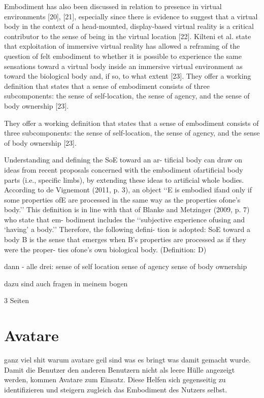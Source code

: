 Embodiment has also been discussed in relation to presence in virtual environments [20], [21], especially since there is evidence to suggest that a virtual body in the context of a head-mounted, display-based virtual reality is a critical contributor to the sense of being in the virtual location [22]. Kilteni et al. state that exploitation of immersive virtual reality has allowed a reframing of the question of felt embodiment to whether it is possible to experience the same sensations toward a virtual body inside an immersive virtual environment as toward the biological body and, if so, to what extent [23]. They offer a working definition that states that a sense of embodiment consists of three subcomponents: the sense of self-location, the sense of agency, and the sense of body ownership [23].


They offer a working definition that states that a sense of embodiment consists of three subcomponents: the sense of self-location, the sense of agency, and the sense of body ownership [23].
\cite{Tham2018}

Understanding and defining the SoE toward an ar-
tificial body can draw on ideas from recent proposals concerned with the embodiment ofartificial body parts (i.e., specific limbs), by extending these ideas to artificial whole bodies. According to de Vignemont (2011, p. 3), an object ‘‘E is embodied ifand only if some properties ofE are processed in the same way as the properties ofone’s body.’’ This definition is in line with that of Blanke and Metzinger (2009, p. 7) who state that em- bodiment includes the ‘‘subjective experience ofusing and ‘having’ a body.’’ Therefore, the following defini- tion is adopted:
SoE toward a body B is the sense that emerges when
B’s properties are processed as if they were the proper- ties ofone’s own biological body. (Definition: D)
\cite{Kilteni2012}

dann - alle drei:
sense of self location
sense of agency
sense of body ownership

dazu sind auch fragen in meinem bogen



3 Seiten

\section{Avatare}
ganz viel shit warum avatare geil sind was es bringt was damit gemacht wurde.
Damit die Benutzer den anderen Benutzern nicht als leere Hülle angezeigt werden, kommen Avatare zum Einsatz. Diese Helfen sich gegenseitig zu identifizieren und steigern zugleich das Embodiment des Nutzers selbst. 

